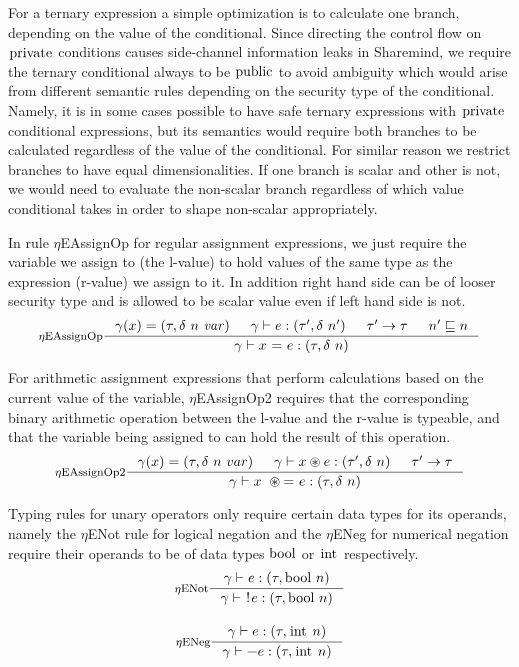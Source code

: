 \documentclass[a4paper, 10pt, draft]{report}
\newcommand{\mycode}[1]{\ensuremath{\mbox{\lstinline{#1}}}}
\begin{document}
For a ternary expression a simple optimization is to calculate one branch,
depending on the value of the conditional. Since directing the control flow on
\mycode{private} conditions causes side-channel information leaks in Sharemind,
we require the ternary conditional always to be \mycode{public} to avoid
ambiguity which would arise from different semantic rules depending on the
security type of the conditional. Namely, it is in some cases possible to have
safe ternary expressions with \mycode{private} conditional expressions, but its
semantics would require both branches to be calculated regardless of the value
of the conditional. For similar reason we restrict branches to have equal
dimensionalities. If one branch is scalar and other is not, we would need to
evaluate the non-scalar branch regardless of which value conditional takes in
order to shape non-scalar appropriately.

In rule $\eta$EAssignOp for regular assignment expressions, we just require the
variable we assign to (the l-value) to hold values of the same type as the
expression (r-value) we assign to it. In addition right hand side can be of
looser security type and is allowed to be scalar value even if left hand side
is not.
\[ \inference[$\eta$EAssignOp]
{
  \gamma(x) = \left(\tau, \delta\ n\ \mathit{var}\right) &
  \gamma |- e : \left(\tau', \delta\ n'\right) &
  \tau' \to \tau  &
  n' \sqsubseteq n
}
{
  \gamma |- x\ \mycode{=}\ e : \left(\tau, \delta\ n\right)
} \]

For arithmetic assignment expressions that perform calculations based on the
current value of the variable, $\eta$EAssignOp2 requires that the corresponding
binary arithmetic operation between the l-value and the r-value is typeable,
and that the variable being assigned to can hold the result of this operation.
\[ \inference[$\eta$EAssignOp2]
{
  \gamma(x) = \left(\tau, \delta\ n\ var\right) &
  \gamma |- x \circledast e : \left(\tau', \delta\ n\right) &
  \tau' \to \tau
}
{
  \gamma |- x\  \circledast \mycode{=}\ e : \left(\tau, \delta\ n\right)
} \]

Typing rules for unary operators only require certain data types for its
operands, namely the $\eta$ENot rule for logical negation and the $\eta$ENeg
for numerical negation require their operands to be of data types \mycode{bool}
or \mycode{int} respectively.
\[\begin{array}{c}
\inference[$\eta$ENot]{\gamma |- e : (\tau, \mycode{bool}\ n)}{\gamma |- \mycode{!}e : (\tau, \mycode{bool}\ n)} \\[2em]
\inference[$\eta$ENeg]{\gamma |- e : (\tau, \mycode{int}\ n)}{\gamma |- \mycode{-}e : (\tau, \mycode{int}\ n)}
\end{array} \]
\end{document}
